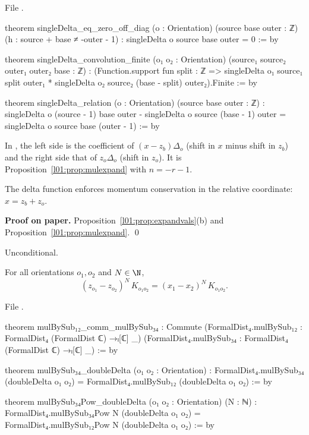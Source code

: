 \noindent File .
\begin{leancode}
theorem singleDelta_eq_zero_off_diag (o : Orientation) (source base outer : ℤ)
    (h : source + base ≠ -outer - 1) : singleDelta o source base outer = 0 := by

theorem singleDelta_convolution_finite (o₁ o₂ : Orientation)
    (source₁ source₂ outer₁ outer₂ base : ℤ) :
    (Function.support fun split : ℤ =>
      singleDelta o₁ source₁ split outer₁ *
        singleDelta o₂ source₂ (base - split) outer₂).Finite := by

theorem singleDelta_relation (o : Orientation) (source base outer : ℤ) :
    singleDelta o (source - 1) base outer - singleDelta o source (base - 1) outer =
      singleDelta o source base (outer - 1) := by
\end{leancode}

\begin{dictionary}
In , the left side is the coefficient of $(x-z_b)\Delta_o$ (shift in $x$ minus shift in $z_b$) and
the right side that of $z_o\Delta_o$ (shift in $z_o$). It is Proposition~\ref{l01:prop:mulexpand} with $n = -r-1$.
\end{dictionary}

\begin{physics}
The delta function enforces momentum conservation in the relative coordinate: $x = z_b+z_o$.
\end{physics}

\textbf{Proof on paper.} Proposition~\ref{l01:prop:expandvals}(b) and Proposition~\ref{l01:prop:mulexpand}. \qed

\begin{status}
Unconditional.
\end{status}

\begin{theorem}\label{l01:thm:outerinner}
For all orientations $o_1,o_2$ and $N\in\N$,
\begin{equation*}
  (z_{o_1}-z_{o_2})^N\,K_{o_1o_2} = (x_1-x_2)^N\,K_{o_1o_2}.
\end{equation*}
\end{theorem}

\noindent File .
\begin{leancode}
theorem mulBySub₁₂_comm_mulBySub₃₄ :
    Commute
      (FormalDist₄.mulBySub₁₂ : FormalDist₄ (FormalDist ℂ) →ₗ[ℂ] _)
      (FormalDist₄.mulBySub₃₄ : FormalDist₄ (FormalDist ℂ) →ₗ[ℂ] _) := by

theorem mulBySub₃₄_doubleDelta (o₁ o₂ : Orientation) :
    FormalDist₄.mulBySub₃₄ (doubleDelta o₁ o₂) =
      FormalDist₄.mulBySub₁₂ (doubleDelta o₁ o₂) := by

theorem mulBySub₃₄Pow_doubleDelta (o₁ o₂ : Orientation) (N : ℕ) :
    FormalDist₄.mulBySub₃₄Pow N (doubleDelta o₁ o₂) =
      FormalDist₄.mulBySub₁₂Pow N (doubleDelta o₁ o₂) := by
\end{leancode}

